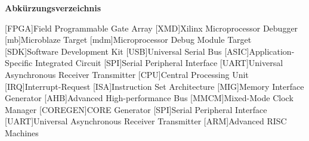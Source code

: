 
{\textbf{Abkürzungsverzeichnis}}

\begin{acronym}[Bash]
 [FPGA]{Field Programmable Gate Array}
 [XMD]{Xilinx Microprocessor Debugger}
 [mb]{Microblaze Target}
 [mdm]{Microprocessor Debug Module Target}
 [SDK]{Software Development Kit}
 [USB]{Universal Serial Bus}
 [ASIC]{Application-Specific Integrated Circuit}
 [SPI]{Serial Peripheral Interface}
 [UART]{Universal Asynchronous Receiver Transmitter}
 [CPU]{Central Processing Unit}
 [IRQ]{Interrupt-Request}
 [ISA]{Instruction Set Architecture}
 [MIG]{Memory Interface Generator}
 [AHB]{Advanced High-performance Bus}
 [MMCM]{Mixed-Mode Clock Manager}
 [COREGEN]{CORE Generator}
 [SPI]{Serial Peripheral Interface}
 [UART]{Universal Asynchronous Receiver Transmitter}
 [ARM]{Advanced RISC Machines}
\end{acronym}
